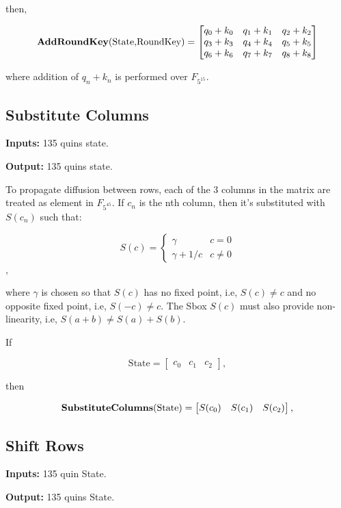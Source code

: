 \documentclass{article}
\begin{document}
then,

\[
\textrm{\textbf{AddRoundKey}(State,RoundKey)} =
\begin{bmatrix}
q_0 + k_0 & q_1 + k_1 & q_2 + k_2 \\
q_3 + k_3 & q_4 + k_4 & q_5 + k_5 \\
q_6 + k_6 & q_7 + k_7 & q_8 + k_8
\end{bmatrix}
\]

where addition of $q_n+k_n$ is performed over $F_{5^{15}}$.

\subsection{Substitute Columns}

\textbf{Inputs:} 135 quins state.

\noindent \textbf{Output:} 135 quins state.

\medskip

To propagate diffusion between rows, each of the 3 columns in the matrix
are treated as element in $F_{5^{45}}$. If $c_n$ is the nth column,
then it's substituted with $S(c_n)$ such that:

\[ S(c) = \begin{cases}
\gamma & c = 0\\
\gamma + 1/c & c\neq 0
\end{cases}
\],

where $\gamma$ is chosen so that $S(c)$ has no fixed point, i.e, $S(c) \neq c$ and no
opposite fixed point, i.e, $S(-c) \neq c$. The Sbox $S(c)$ must also provide
non-linearity, i.e, $S(a + b) \neq S(a) + S(b)$.

If

\[
\textrm{State} = 
\begin{bmatrix}
c_0 & c_1 & c_2
\end{bmatrix},
\]

then

\[
\textrm{\textbf{SubstituteColumns}(State)} =
\begin{bmatrix}
S(c_0) & S(c_1) & S(c_2)
\end{bmatrix},
\]

\subsection{Shift Rows}

\textbf{Inputs:} 135 quin State.

\noindent \textbf{Output:} 135 quins State.
\end{document}
